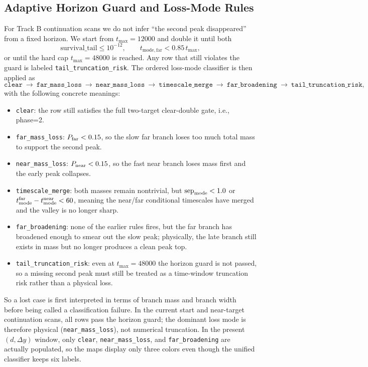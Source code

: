 \documentclass[11pt]{article}
\begin{document}
\subsection*{Adaptive Horizon Guard and Loss-Mode Rules}
For Track B continuation scans we do not infer ``the second peak disappeared'' from a fixed horizon. We start from $t_{\max}=12000$ and double it until both
\[
\mathrm{survival\_tail}\le 10^{-12},
\qquad
t_{\mathrm{mode,far}} < 0.85\, t_{\max},
\]
or until the hard cap $t_{\max}=48000$ is reached. Any row that still violates the guard is labeled \texttt{tail\_truncation\_risk}. The ordered loss-mode classifier is then applied as
\[
\texttt{clear}\ \rightarrow\ \texttt{far\_mass\_loss}\ \rightarrow\ \texttt{near\_mass\_loss}\ \rightarrow\ \texttt{timescale\_merge}\ \rightarrow\ \texttt{far\_broadening}\ \rightarrow\ \texttt{tail\_truncation\_risk},
\]
with the following concrete meanings:
\begin{itemize}
  \item \texttt{clear}: the row still satisfies the full two-target clear-double gate, i.e., phase=2.
  \item \texttt{far\_mass\_loss}: $P_{\rm far}<0.15$, so the slow far branch loses too much total mass to support the second peak.
  \item \texttt{near\_mass\_loss}: $P_{\rm near}<0.15$, so the fast near branch loses mass first and the early peak collapses.
  \item \texttt{timescale\_merge}: both masses remain nontrivial, but $\mathrm{sep}_{\rm mode}<1.0$ or $t_{\rm mode}^{\rm far}-t_{\rm mode}^{\rm near}<60$, meaning the near/far conditional timescales have merged and the valley is no longer sharp.
  \item \texttt{far\_broadening}: none of the earlier rules fires, but the far branch has broadened enough to smear out the slow peak; physically, the late branch still exists in mass but no longer produces a clean peak top.
  \item \texttt{tail\_truncation\_risk}: even at $t_{\max}=48000$ the horizon guard is not passed, so a missing second peak must still be treated as a time-window truncation risk rather than a physical loss.
\end{itemize}
So a lost case is first interpreted in terms of branch mass and branch width before being called a classification failure. In the current start and near-target continuation scans, all rows pass the horizon guard; the dominant loss mode is therefore physical (\texttt{near\_mass\_loss}), not numerical truncation. In the present $(d,\Delta y)$ window, only \texttt{clear}, \texttt{near\_mass\_loss}, and \texttt{far\_broadening} are actually populated, so the maps display only three colors even though the unified classifier keeps six labels.
\end{document}
